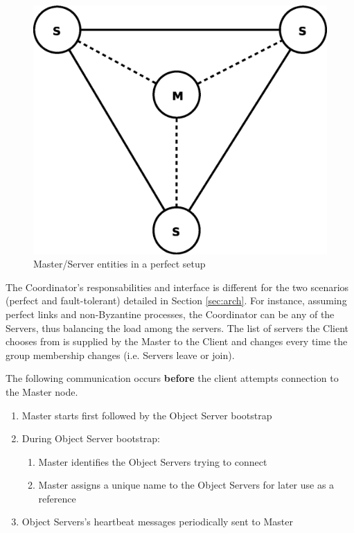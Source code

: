 \documentclass[times, 10pt,twocolumn]{article}
\begin{document}
\begin{figure}
\centering
\includegraphics[scale=0.3]{perfect.eps}
\caption{Master/Server entities in a perfect setup}
\label{fig:perf}
\end{figure}

\label{subsec:recov}

\label{subsec:recov}

The Coordinator's responsabilities and interface is different for the two scenarios (perfect and fault-tolerant) detailed in Section \ref{sec:arch}. For instance, assuming perfect links and non-Byzantine processes, the Coordinator can be any of the Servers, thus balancing the load among the servers. The list of servers the Client chooses from is supplied by the Master to the Client and changes every time the group membership changes (i.e. Servers leave or join). 

\label{sec:algor}

The following communication occurs {\bf before} the client attempts connection 
to the Master node.
\begin{enumerate}
\item Master starts first followed by the Object Server bootstrap
\item During Object Server bootstrap:
\begin{enumerate}
\item Master identifies the Object Servers trying to connect
\item Master assigns a unique name to the Object Servers for later use as a reference
\end{enumerate}
\item Object Servers's heartbeat messages periodically sent to Master
\end{enumerate}
\end{document}
